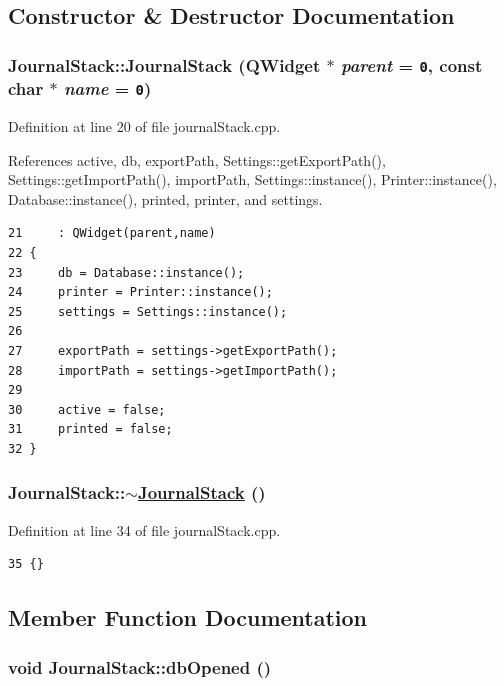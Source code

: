 \subsection{Constructor \& Destructor Documentation}
\hypertarget{classJournalStack_a0}{
\subsubsection[JournalStack]{\setlength{\rightskip}{0pt plus 5cm}Journal\-Stack::Journal\-Stack (QWidget $\ast$ {\em parent} = {\tt 0}, const char $\ast$ {\em name} = {\tt 0})}}
\label{classJournalStack_a0}


Definition at line 20 of file journal\-Stack.cpp.

References active, db, export\-Path, Settings::get\-Export\-Path(), Settings::get\-Import\-Path(), import\-Path, Settings::instance(), Printer::instance(), Database::instance(), printed, printer, and settings.

\footnotesize\begin{verbatim}21     : QWidget(parent,name)
22 {
23     db = Database::instance();
24     printer = Printer::instance();
25     settings = Settings::instance();
26 
27     exportPath = settings->getExportPath();
28     importPath = settings->getImportPath();
29     
30     active = false;
31     printed = false;
32 }
\end{verbatim}\normalsize 


\hypertarget{classJournalStack_a1}{
\subsubsection[$\sim$JournalStack]{\setlength{\rightskip}{0pt plus 5cm}Journal\-Stack::$\sim$\hyperlink{classJournalStack}{Journal\-Stack} ()}}
\label{classJournalStack_a1}


Definition at line 34 of file journal\-Stack.cpp.

\footnotesize\begin{verbatim}35 {}
\end{verbatim}\normalsize 




\subsection{Member Function Documentation}
\hypertarget{classJournalStack_k0}{
\subsubsection[dbOpened]{\setlength{\rightskip}{0pt plus 5cm}void Journal\-Stack::db\-Opened ()}}
\label{classJournalStack_k0}


